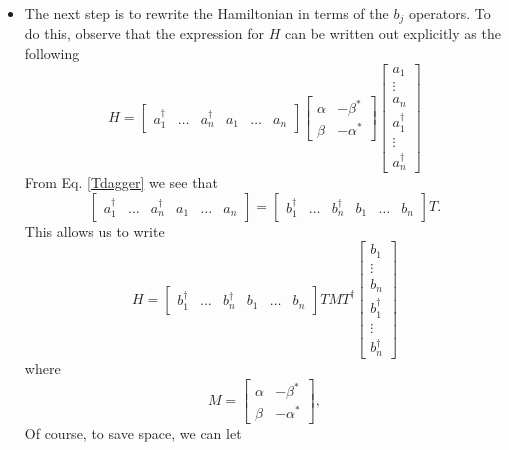 \documentclass{book}
\theoremstyle{definition}
\newcommand{\al}{\alpha}
\newcommand{\be}{\beta}
\begin{document}
\begin{itemize}
	
	\item The next step is to rewrite the Hamiltonian in terms of the $b_j$ operators. To do this, observe that the expression for $H$ can be written out explicitly as the following
	\begin{equation}
	H = \begin{bmatrix}
	a_1^\dagger& \dots & a_n^\dagger& a_1&\dots&a_n 
	\end{bmatrix}
	\begin{bmatrix}
	\al & -\beta^* \\ \beta & -\al^*
	\end{bmatrix}
	\begin{bmatrix}
	a_1 \\ \vdots \\ a_n \\ a_1^\dagger \\ \vdots \\ a_n^\dagger
	\end{bmatrix}
	\end{equation}
	From Eq. \ref{Tdagger} we see that
	\begin{equation}
	\begin{bmatrix}
	a_1^\dagger& \dots & a_n^\dagger& a_1&\dots&a_n 
	\end{bmatrix} = \begin{bmatrix}
	b_1^\dagger& \dots & b_n^\dagger& b_1&\dots&b_n 
	\end{bmatrix}T.
	\end{equation}
	This allows us to write 
	\begin{equation}
	H = \begin{bmatrix}
	b_1^\dagger& \dots & b_n^\dagger& b_1&\dots&b_n 
	\end{bmatrix}T M T^\dagger \begin{bmatrix}
	b_1 \\ \vdots \\ b_n \\ b_1^\dagger \\ \vdots \\ b_n^\dagger
	\end{bmatrix}
	\end{equation}
	where 
	\begin{equation}
	M = \begin{bmatrix}
	\al & -\be^* \\ \beta & -\al^* 
	\end{bmatrix},
	\end{equation}
 	Of course, to save space, we can let 
 	\begin{equation}

\end{equation}
\end{itemize}
\end{document}
